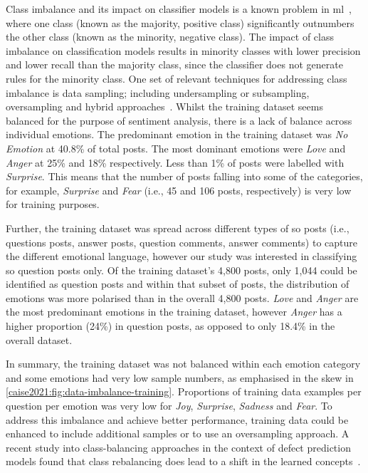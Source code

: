 Class imbalance and its impact on classifier models is a known problem in \gls{ml}~\citep{Lopez2014, Weiss2004}, where  one class (known as the majority, positive class) significantly outnumbers the other class (known as the minority, negative class).  The impact of class imbalance on classification models results in minority classes with lower precision and lower recall than the majority class, since the classifier does not generate rules for the minority class.  One set of relevant techniques for addressing class imbalance is data sampling; including undersampling or subsampling, oversampling and hybrid approaches~\citep{Lopez2014}.
Whilst the training dataset seems balanced for the purpose of sentiment analysis, there is a lack of balance across individual emotions.  The predominant emotion in the training dataset was \textit{No Emotion} at 40.8\% of total posts. The most dominant emotions were \textit{Love} and \textit{Anger} at 25\% and 18\% respectively.  Less than 1\% of posts were labelled with \textit{Surprise}.  This means that the number of posts falling into some of the categories, for example, \textit{Surprise} and \textit{Fear} (i.e., 45 and 106 posts, respectively) is very low for training purposes. 

Further, the training dataset was spread across different types of \gls{so} posts (i.e., questions posts, answer posts, question comments, answer comments) to capture the different emotional language, however our study was interested in classifying \gls{so} question posts only. Of the training dataset's 4,800 posts, only 1,044 could be identified as question posts and within that subset of posts, the distribution of emotions was more polarised than in the overall 4,800 posts. \textit{Love} and \textit{Anger} are the most predominant emotions in the training dataset, however \textit{Anger} has a higher proportion (24\%) in question posts, as opposed to only 18.4\% in the overall dataset. 

In summary, the training dataset was not balanced within each emotion category and some emotions had very low sample numbers, as emphasised in the skew in \cref{caise2021:fig:data-imbalance-training}.  Proportions of training data examples per question per emotion was very low for \textit{Joy}, \textit{Surprise}, \textit{Sadness} and \textit{Fear}.
To address this imbalance and achieve better performance, training data could be enhanced to include additional samples or to use an oversampling approach.  A recent study into class-balancing approaches in the context of defect prediction models found that class rebalancing does lead to a shift in the learned concepts~\citep{Turhan2012OnModels}.

